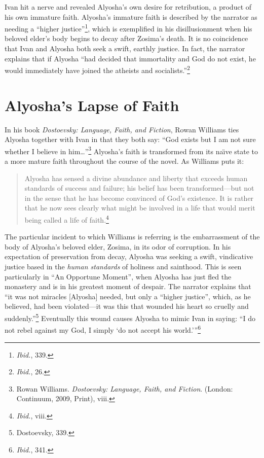 Ivan hit a nerve and revealed Alyosha's own desire for retribution, a product of his own immature faith. Alyosha's immature faith is described by the narrator as needing a ``higher justice''\footnote{\emph{Ibid.}, 339.}, which is exemplified in his disillusionment when his beloved elder's body begins to decay after Zosima's death. It is no coincidence that Ivan and Alyosha both seek a swift, earthly justice. In fact, the narrator explains that if Alyosha ``had decided that immortality and God do not exist, he would immediately have joined the atheists and socialists.''\footnote{\emph{Ibid.}, 26.} 

\section{Alyosha's Lapse of Faith}
In his book \emph{Dostoevsky: Language, Faith, and Fiction}, Rowan Williams ties Alyosha together with Ivan in that they both say: ``God exists but I am not sure whether I believe in him\ldots''\footnote{Rowan Williams. \emph{Dostoevsky: Language, Faith, and Fiction}. (London: Continuum, 2009, Print), viii.} Alyosha's faith is transformed from its na\"{\i}ve state to a more mature faith throughout the course of the novel. As Williams puts it: 

\begin{quote}
\onehalfspacing
Alyosha has sensed a divine abundance and liberty that exceeds human standards of success and failure; his belief has been transformed---but not in the sense that he has become convinced of God's existence. It is rather that he now sees clearly what might be involved in a life that would merit being called a life of faith.\footnote{\emph{Ibid.}, viii.} 
\end{quote}

The particular incident to which Williams is referring is the embarrassment of the body of Alyosha's beloved elder, Zosima, in its odor of corruption. In his expectation of preservation from decay, Alyosha was seeking a swift, vindicative justice based in the \emph{human standards} of holiness and sainthood. This is seen particularly in ``An Opportune Moment'', when Alyosha has just fled the monastery and is in his greatest moment of despair. The narrator explains that ``it was not miracles [Alyosha] needed, but only a ``higher justice'', which, as he believed, had been violated---it was this that wounded his heart so cruelly and suddenly.''\footnote{Dostoevsky, 339.} Eventually this wound causes Alyosha to mimic Ivan in saying: ``I do not rebel against my God, I simply `do not accept his world.'\thinspace''\footnote{\emph{Ibid.}, 341.}

